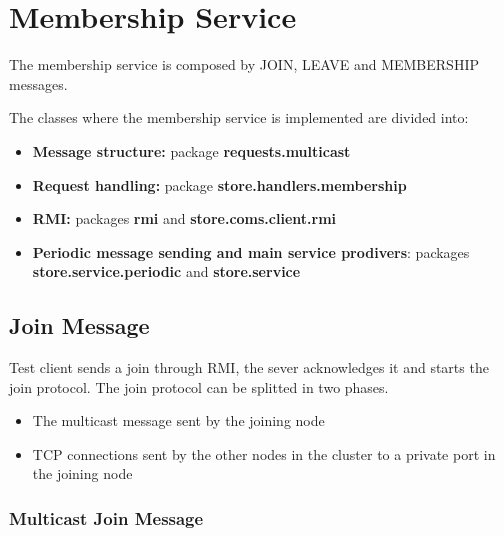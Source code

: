 \section{Membership Service}

The membership service is composed by JOIN, LEAVE and MEMBERSHIP messages. 

The classes where the membership service is implemented are divided into:

\begin{itemize}
    \item \textbf{Message structure:} package \textbf{requests.multicast}
    \item \textbf{Request handling:} package \textbf{store.handlers.membership}
    \item \textbf{RMI:} packages \textbf{rmi} and \textbf{store.coms.client.rmi}
    \item \textbf{Periodic message sending and main service prodivers}: packages \textbf{store.service.periodic} and \textbf{store.service}
\end{itemize}


\subsection{Join Message} 

Test client sends a join through RMI, the sever acknowledges it and starts the join protocol.
The join protocol can be splitted in two phases.
\begin{itemize}
    \item The multicast message sent by the joining node
    \item TCP connections sent by the other nodes in the cluster to a private port in the joining node
\end{itemize}


\subsubsection{Multicast Join Message} 

